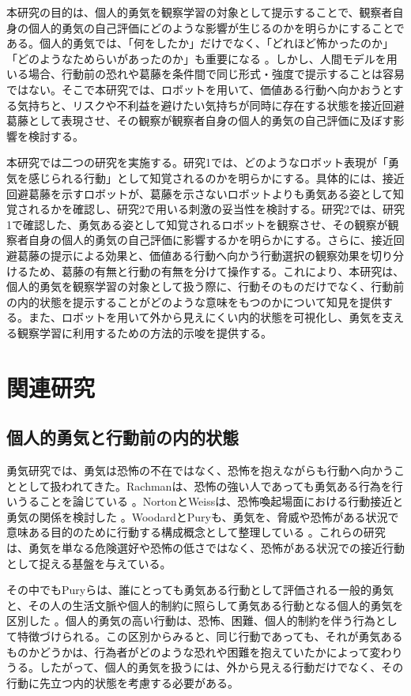 \documentclass[utf8]{FrontiersinHarvard}
\begin{document}
本研究の目的は、個人的勇気を観察学習の対象として提示することで、観察者自身の個人的勇気の自己評価にどのような影響が生じるのかを明らかにすることである。個人的勇気では、「何をしたか」だけでなく、「どれほど怖かったのか」「どのようなためらいがあったのか」も重要になる \citep{pury2007}。しかし、人間モデルを用いる場合、行動前の恐れや葛藤を条件間で同じ形式・強度で提示することは容易ではない。そこで本研究では、ロボットを用いて、価値ある行動へ向かおうとする気持ちと、リスクや不利益を避けたい気持ちが同時に存在する状態を接近回避葛藤として表現させ、その観察が観察者自身の個人的勇気の自己評価に及ぼす影響を検討する。

本研究では二つの研究を実施する。研究1では、どのようなロボット表現が「勇気を感じられる行動」として知覚されるのかを明らかにする。具体的には、接近回避葛藤を示すロボットが、葛藤を示さないロボットよりも勇気ある姿として知覚されるかを確認し、研究2で用いる刺激の妥当性を検討する。研究2では、研究1で確認した、勇気ある姿として知覚されるロボットを観察させ、その観察が観察者自身の個人的勇気の自己評価に影響するかを明らかにする。さらに、接近回避葛藤の提示による効果と、価値ある行動へ向かう行動選択の観察効果を切り分けるため、葛藤の有無と行動の有無を分けて操作する。これにより、本研究は、個人的勇気を観察学習の対象として扱う際に、行動そのものだけでなく、行動前の内的状態を提示することがどのような意味をもつのかについて知見を提供する。また、ロボットを用いて外から見えにくい内的状態を可視化し、勇気を支える観察学習に利用するための方法的示唆を提供する。

\section{関連研究}

\subsection{個人的勇気と行動前の内的状態}

勇気研究では、勇気は恐怖の不在ではなく、恐怖を抱えながらも行動へ向かうこととして扱われてきた。Rachmanは、恐怖の強い人であっても勇気ある行為を行いうることを論じている \citep{rachman1984}。NortonとWeissは、恐怖喚起場面における行動接近と勇気の関係を検討した \citep{norton2009}。WoodardとPuryも、勇気を、脅威や恐怖がある状況で意味ある目的のために行動する構成概念として整理している \citep{woodard2007}。これらの研究は、勇気を単なる危険選好や恐怖の低さではなく、恐怖がある状況での接近行動として捉える基盤を与えている。

その中でもPuryらは、誰にとっても勇気ある行動として評価される一般的勇気と、その人の生活文脈や個人的制約に照らして勇気ある行動となる個人的勇気を区別した \citep{pury2007}。個人的勇気の高い行動は、恐怖、困難、個人的制約を伴う行為として特徴づけられる。この区別からみると、同じ行動であっても、それが勇気あるものかどうかは、行為者がどのような恐れや困難を抱えていたかによって変わりうる。したがって、個人的勇気を扱うには、外から見える行動だけでなく、その行動に先立つ内的状態を考慮する必要がある。
\end{document}

